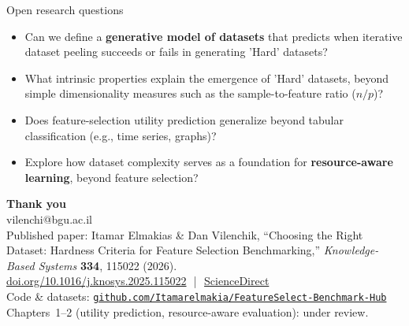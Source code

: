 \documentclass[aspectratio=169,10pt,dvipsnames]{beamer}
\newcommand{\kbsfull}{Itamar Elmakias \& Dan Vilenchik,
  ``Choosing the Right Dataset: Hardness Criteria for Feature Selection
  Benchmarking,'' \emph{Knowledge-Based Systems} \textbf{334}, 115022 (2026).}
\newcommand{\kbsdoi}{\href{https://doi.org/10.1016/j.knosys.2025.115022}%
  {doi.org/10.1016/j.knosys.2025.115022}}
\newcommand{\kbssd}{\href{https://www.sciencedirect.com/science/article/abs/pii/S095070512502060X}%
  {ScienceDirect}}
\newcommand{\repo}{\href{https://github.com/Itamarelmakia/FeatureSelect-Benchmark-Hub}%
  {\texttt{github.com/Itamarelmakia/FeatureSelect-Benchmark-Hub}}}
\begin{document}
\begin{frame}{Open research questions}

\begin{itemize}

\item Can we define a \textbf{generative model of datasets} that predicts
when iterative dataset peeling succeeds or fails in generating 'Hard' datasets?

\pause

\item What intrinsic properties explain the emergence of
'Hard' datasets, beyond simple dimensionality measures such as
the sample-to-feature ratio ($n/p$)?
    \pause


    \item Does feature-selection utility prediction generalize beyond tabular
    classification (e.g., time series, graphs)?

    \pause

    \item Explore how dataset complexity serves as a foundation for
    \textbf{resource-aware learning}, beyond feature selection?
\end{itemize}

\end{frame}

{
\begin{frame}
\vspace{0.7cm}
\begin{center}
{\Large\bfseries\color{bgucolor} Thank you}\\[6pt]
{\normalsize\color{gray} vilenchi@bgu.ac.il}\\[16pt]

\small
Published paper: \kbsfull\\[2pt]
\kbsdoi\ \,|\,\ \kbssd\\[10pt]
Code \& datasets: \repo\\[10pt]
\color{gray}Chapters~1--2 (utility prediction, resource-aware evaluation): under review.
\end{center}
\end{frame}
}
\end{document}
